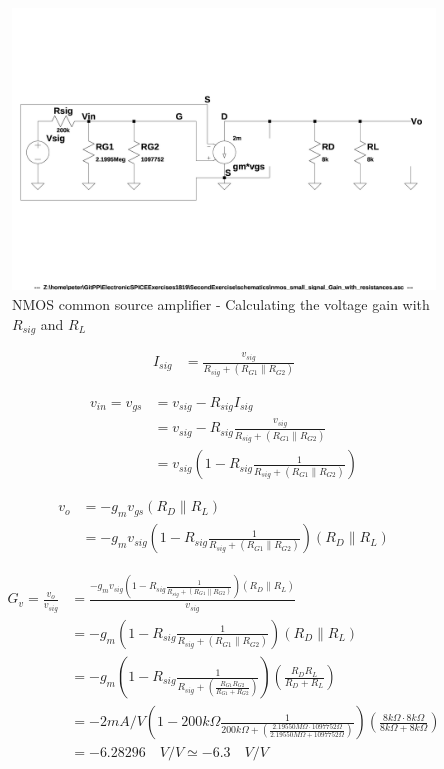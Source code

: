 \documentclass[10pt,a4paper]{book}
\begin{document}
\begin{figure}[h]
  \centering
  \includegraphics[width=12cm]{schematics/nmos_small_signal_with_resistances.jpg}
  \caption{NMOS common source amplifier - Calculating the voltage gain with $R_{sig}$ and $R_L$}
  \label{nmos_pi_gain_with_resistances}
\end{figure}

\begin{align}
I_{sig} &= \frac{v_{sig}}{R_{sig} + (R_{G1} \parallel R_{G2})}
\end{align}

\begin{align}
v_{in} = v_{gs} &= v_{sig} - R_{sig} I_{sig}\\
&= v_{sig} - R_{sig} \frac{v_{sig}}{R_{sig} + (R_{G1} \parallel R_{G2})}\\
&= v_{sig} \left(1 - R_{sig} \frac{1}{R_{sig} + (R_{G1} \parallel R_{G2})}\right)
\end{align}

\begin{align}
v_o &= -g_m v_{gs} (R_D \parallel R_L)\\
&= -g_m v_{sig} \left(1 - R_{sig} \frac{1}{R_{sig} + (R_{G1} \parallel R_{G2})}\right) (R_D \parallel R_L)
\end{align}


\begin{align}
G_v = \frac{v_o}{v_{sig}} &= \frac{-g_m v_{sig} \left(1 - R_{sig} \frac{1}{R_{sig} + (R_{G1} \parallel R_{G2})}\right) (R_D \parallel R_L)}{v_{sig}}\\
&= -g_m \left(1 - R_{sig} \frac{1}{R_{sig} + (R_{G1} \parallel R_{G2})}\right) (R_D \parallel R_L)\\
&= -g_m \left(1 - R_{sig} \frac{1}{R_{sig} + \left(\frac{R_{G1}R_{G2}}{R_{G1}+R_{G2}}\right)}\right) \left(\frac{R_{D}R_{L}}{R_{D}+R_{L}}\right)\\
&= - 2mA/V \left(1 - 200k\Omega \frac{1}{200k\Omega + \left(\frac{2.19550M\Omega \cdot 1097752\Omega}{2.19550M\Omega +1097752\Omega}\right)}\right) \left(\frac{8k\Omega \cdot 8k\Omega}{8k\Omega + 8k\Omega}\right)\\
&= -6.28296 \quad V/V \simeq -6.3 \quad V/V \label{Gv}
\end{align}
\end{document}
